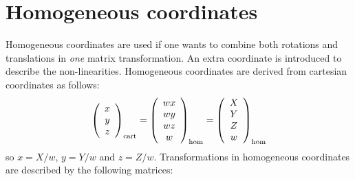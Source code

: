 \documentclass[a4paper,fancyheadings,twoside]{report}
\begin{document}
\section{Homogeneous coordinates}
Homogeneous coordinates are used if one wants to combine both rotations and
translations in {\it one} matrix transformation. An extra coordinate is
introduced to describe the non-linearities. Homogeneous coordinates are derived
from cartesian coordinates as follows:
\[
\left(\begin{array}{c}x\\ y\\ z\end{array}\right)_{\rm cart}=
\left(\begin{array}{c}wx\\ wy\\ wz\\ w\end{array}\right)_{\rm hom}=
\left(\begin{array}{c}X\\ Y\\ Z\\ w\end{array}\right)_{\rm hom}
\]
so $x=X/w$, $y=Y/w$ and $z=Z/w$. Transformations in homogeneous coordinates
are described by the following matrices:
\end{document}
